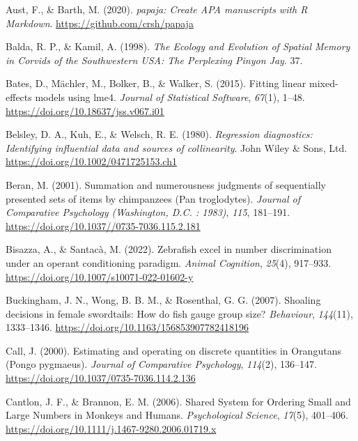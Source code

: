 \documentclass[
  ,pub,floatsintext]{apa6}
\newlength{\cslhangindent}
\newlength{\cslentryspacingunit} %
\newenvironment{CSLReferences}[2] %
 {%
  \setlength{\parindent}{0pt}
  \ifodd #1
  \let\oldpar\par
  \def\par{\hangindent=\cslhangindent\oldpar}
  \fi
  \setlength{\parskip}{#2\cslentryspacingunit}
 }%
 {}
\begin{document}
\begin{CSLReferences}{1}{0}
\leavevmode{}%
Aust, F., \& Barth, M. (2020). \emph{{papaja}: {Create} {APA} manuscripts with {R Markdown}}. \url{https://github.com/crsh/papaja}

\leavevmode{}%
Balda, R. P., \& Kamil, A. (1998). \emph{The {Ecology} and {Evolution} of {Spatial Memory} in {Corvids} of the {Southwestern USA}: {The Perplexing Pinyon Jay}}. 37.

\leavevmode{}%
Bates, D., Mächler, M., Bolker, B., \& Walker, S. (2015). Fitting linear mixed-effects models using {lme4}. \emph{Journal of Statistical Software}, \emph{67}(1), 1--48. \url{https://doi.org/10.18637/jss.v067.i01}

\leavevmode{}%
Belsley, D. A., Kuh, E., \& Welsch, R. E. (1980). \emph{Regression diagnostics: Identifying influential data and sources of collinearity}. John Wiley \& Sons, Ltd. \url{https://doi.org/10.1002/0471725153.ch1}

\leavevmode{}%
Beran, M. (2001). Summation and numerousness judgments of sequentially presented sets of items by chimpanzees ({Pan} troglodytes). \emph{Journal of Comparative Psychology (Washington, D.C. : 1983)}, \emph{115}, 181--191. \url{https://doi.org/10.1037//0735-7036.115.2.181}

\leavevmode{}%
Bisazza, A., \& Santacà, M. (2022). Zebrafish excel in number discrimination under an operant conditioning paradigm. \emph{Animal Cognition}, \emph{25}(4), 917--933. \url{https://doi.org/10.1007/s10071-022-01602-y}

\leavevmode{}%
Buckingham, J. N., Wong, B. B. M., \& Rosenthal, G. G. (2007). Shoaling decisions in female swordtails: {How} do fish gauge group size? \emph{Behaviour}, \emph{144}(11), 1333--1346. \url{https://doi.org/10.1163/156853907782418196}

\leavevmode{}%
Call, J. (2000). Estimating and operating on discrete quantities in {Orangutans} ({Pongo} pygmaeus). \emph{Journal of Comparative Psychology}, \emph{114}(2), 136--147. \url{https://doi.org/10.1037/0735-7036.114.2.136}

\leavevmode{}%
Cantlon, J. F., \& Brannon, E. M. (2006). Shared {System} for {Ordering Small} and {Large Numbers} in {Monkeys} and {Humans}. \emph{Psychological Science}, \emph{17}(5), 401--406. \url{https://doi.org/10.1111/j.1467-9280.2006.01719.x}


\end{CSLReferences}
\end{document}
